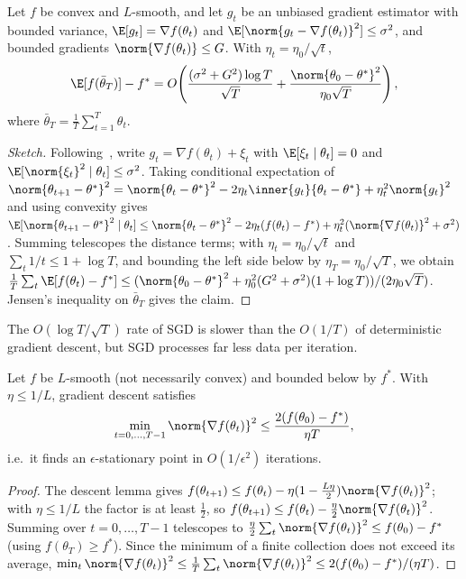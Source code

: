 \begin{theorem}
\label{thm:found:sgd-convergence}
Let $f$ be convex and $L$-smooth, and let $g_t$ be an unbiased gradient estimator
with bounded variance, $\E[g_t] = \nabla f(\theta_t)$ and
$\E[\norm{g_t - \nabla f(\theta_t)}^2] \le \sigma^2$, and bounded gradients
$\norm{\nabla f(\theta_t)} \le G$. With $\eta_t = \eta_0/\sqrt{t}$,
\[
  \E[f(\bar\theta_T)] - f^* = O\!\left(\frac{(\sigma^2 + G^2)\log T}{\sqrt{T}}
  + \frac{\norm{\theta_0 - \theta^*}^2}{\eta_0\sqrt{T}}\right),
\]
where $\bar\theta_T = \frac{1}{T}\sum_{t=1}^T \theta_t$.
\end{theorem}

\begin{proof}[Sketch]
Following~\citet{bottou2018optimization}, write $g_t = \nabla f(\theta_t) +
\xi_t$ with $\E[\xi_t \mid \theta_t] = 0$ and
$\E[\norm{\xi_t}^2 \mid \theta_t] \le \sigma^2$. Taking conditional expectation
of $\norm{\theta_{t+1} - \theta^*}^2 = \norm{\theta_t - \theta^*}^2 -
2\eta_t \inner{g_t}{\theta_t - \theta^*} + \eta_t^2\norm{g_t}^2$ and using
convexity gives
$\E[\norm{\theta_{t+1} - \theta^*}^2 \mid \theta_t] \le \norm{\theta_t -
\theta^*}^2 - 2\eta_t(f(\theta_t) - f^*) + \eta_t^2(\norm{\nabla f(\theta_t)}^2 +
\sigma^2)$. Summing telescopes the distance terms; with $\eta_t = \eta_0/\sqrt{t}$
and $\sum_t 1/t \le 1 + \log T$, and bounding the left side below by
$\eta_T = \eta_0/\sqrt{T}$, we obtain
$\frac{1}{T}\sum_t \E[f(\theta_t) - f^*] \le (\norm{\theta_0 - \theta^*}^2 +
\eta_0^2(G^2 + \sigma^2)(1 + \log T))/(2\eta_0\sqrt{T})$. Jensen's inequality on
$\bar\theta_T$ gives the claim.
\end{proof}

The $O(\log T/\sqrt{T})$ rate of SGD is slower than the $O(1/T)$ of deterministic
gradient descent, but SGD processes far less data per iteration.

\begin{theorem}
\label{thm:found:gd-nonconvex}
Let $f$ be $L$-smooth (not necessarily convex) and bounded below by $f^*$. With
$\eta \le 1/L$, gradient descent satisfies
\[
  \min_{t=0,\ldots,T-1} \norm{\nabla f(\theta_t)}^2 \le
  \frac{2(f(\theta_0) - f^*)}{\eta T},
\]
i.e.\ it finds an $\epsilon$-stationary point in $O(1/\epsilon^2)$ iterations.
\end{theorem}

\begin{proof}
The descent lemma gives $f(\theta_{t+1}) \le f(\theta_t) - \eta(1 -
\frac{L\eta}{2})\norm{\nabla f(\theta_t)}^2$; with $\eta \le 1/L$ the factor is
at least $\frac12$, so $f(\theta_{t+1}) \le f(\theta_t) -
\frac{\eta}{2}\norm{\nabla f(\theta_t)}^2$. Summing over $t = 0, \ldots, T-1$
telescopes to $\frac{\eta}{2}\sum_t \norm{\nabla f(\theta_t)}^2 \le f(\theta_0) -
f^* $ (using $f(\theta_T) \ge f^*$). Since the minimum of a finite collection
does not exceed its average, $\min_t \norm{\nabla f(\theta_t)}^2 \le
\frac{1}{T}\sum_t \norm{\nabla f(\theta_t)}^2 \le 2(f(\theta_0) - f^*)/(\eta T)$.
\end{proof}

